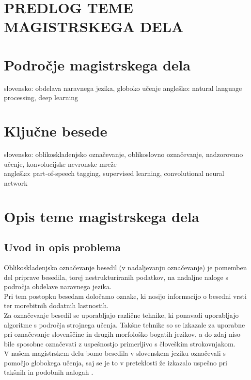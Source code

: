 \documentclass[a4paper, 12pt]{article}
\begin{document}
\clearpage
\section*{PREDLOG TEME MAGISTRSKEGA DELA}

\section{Področje magistrskega dela}

slovensko: obdelava naravnega jezika, globoko učenje
angleško: natural language processing, deep learning


\section{Ključne besede}

slovensko: oblikoskladenjsko označevanje, oblikoslovno označevanje, nadzorovano učenje, konvolucijske nevronske mreže\\
angleško: part-of-speech tagging, supervised learning, convolutional neural network


\section{Opis teme magistrskega dela}

\subsection{Uvod in opis problema}

Oblikoskladenjsko označevanje besedil (v nadaljevanju označevanje) je pomemben del priprave besedila, torej nestrukturiranih podatkov, na nadaljne naloge s področja obdelave naravnega jezika.\\
Pri tem postopku besedam določamo oznake, ki nosijo informacijo o besedni vrsti ter morebitnih dodatnih lastnostih. \\
Za označevanje besedil se uporabljajo različne tehnike, ki ponavadi uporabljajo algoritme s področja strojnega učenja. Takšne tehnike so se izkazale za uporabne pri označevanje slovenščine in drugih morfološko bogatih jezikov, a do zdaj niso bile sposobne označevati z uspešnostjo primerljivo s človeškim strokovnjakom.\\
V našem magistrskem delu bomo besedila v slovenskem jeziku označevali s pomočjo globokega učenja, saj se je to v preteklosti že izkazalo uspešno pri takšnih in podobnih nalogah \cite{Santos2014,Labeau2015}.
\end{document}
